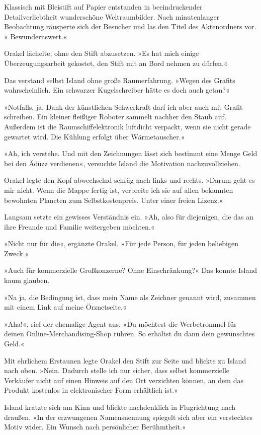 Klassisch mit Bleistift auf Papier entstanden in beeindruckender Detailverliebtheit wunderschöne Weltraumbilder. Nach minutenlanger Beobachtung räusperte sich der Besucher und las den Titel des Aktenordners vor. » Bewundernswert.«

Orakel lächelte, ohne den Stift abzusetzen. »Es hat mich einige Überzeugungsarbeit gekostet, den Stift mit an Bord nehmen zu dürfen.«

Das verstand selbst Island ohne große Raumerfahrung. »Wegen des Grafits wahrscheinlich. Ein schwarzer Kugelschreiber hätte es doch auch getan?«

»Notfalls, ja. Dank der künstlichen Schwerkraft darf ich aber auch mit Grafit schreiben. Ein kleiner fleißiger Roboter sammelt nachher den Staub auf. Außerdem ist die Raumschiffelektronik luftdicht verpackt, wenn sie nicht gerade gewartet wird. Die Kühlung erfolgt über Wärmetauscher.«

»Ah, ich verstehe. Und mit den Zeichnungen lässt sich bestimmt eine Menge Geld bei den Äöüzz verdienen«, versuchte Island die Motivation nachzuvollziehen.

Orakel legte den Kopf abwechselnd schräg nach links und rechts. »Darum geht es mir nicht. Wenn die Mappe fertig ist, verbreite ich sie auf allen bekannten bewohnten Planeten zum Selbstkostenpreis. Unter einer freien Lizenz.«

Langsam setzte ein gewisses Verständnis ein. »Ah, also für diejenigen, die das an ihre Freunde und Familie weitergeben möchten.«

»Nicht nur für die«, ergänzte Orakel. »Für jede Person, für jeden beliebigen Zweck.«

»Auch für kommerzielle Großkonzerne? Ohne Einschränkung?« Das konnte Island kaum glauben.

»Na ja, die Bedingung ist, dass mein Name als Zeichner genannt wird, zusammen mit einem Link auf meine Örznetseite.«

»Aha!«, rief der ehemalige Agent aus. »Du möchtest die Werbetrommel für deinen Online-Merchandising-Shop rühren. So erhältst du dann dein gewünschtes Geld.«

Mit ehrlichem Erstaunen legte Orakel den Stift zur Seite und blickte zu Island nach oben. »Nein. Dadurch stelle ich nur sicher, dass selbst kommerzielle Verkäufer nicht auf einen Hinweis auf den Ort verzichten können, an dem das Produkt kostenlos in elektronischer Form erhältlich ist.«

Island kratzte sich am Kinn und blickte nachdenklich in Flugrichtung nach draußen. »In der erzwungenen Namensnennung spiegelt sich aber ein verstecktes Motiv wider. Ein Wunsch nach persönlicher Berühmtheit.«

